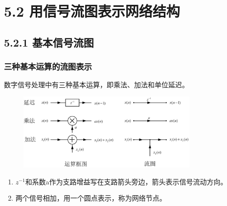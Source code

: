 \documentclass[notheorems,compress,mathserif,table]{beamer}
\begin{document}
\section{5.2 用信号流图表示网络结构}

\subsection{5.2.1 基本信号流图}
\begin{frame}[shrink]\frametitle{三种基本运算的流图表示}
数字信号处理中有三种基本运算，即乘法、加法和单位延迟。%
\begin{figure}[h]
  \centering
  \includegraphics[width=0.8\textwidth]{jibenliutu.jpg}
  \label{graph:chp5jibenliutu}
\end{figure}
\begin{enumerate}
  \item $z^{-1}$和系数a作为支路增益写在支路箭头旁边，箭头表示信号流动方向。
  \item 两个信号相加，用一个圆点表示，称为网络节点。
\end{enumerate}
\end{frame}
\end{document}
